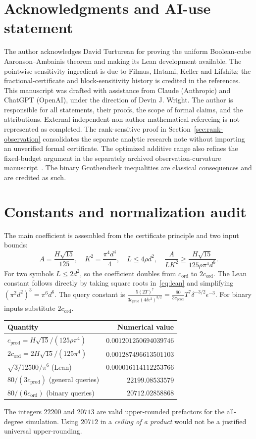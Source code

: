 \documentclass[11pt]{article}
\numberwithin{equation}{section}
\theoremstyle{remark}
\newcommand{\cprod}{c_{\mathrm{prod}}}
\newcommand{\cord}{c_{\mathrm{ord}}}
\begin{document}
\section*{Acknowledgments and AI-use statement}
The author acknowledges David Turturean for proving the uniform Boolean-cube Aaronson--Ambainis theorem and making its Lean development available. The pointwise sensitivity ingredient is due to Filmus, Hatami, Keller and Lifshitz; the fractional-certificate and block-sensitivity history is credited in the references. This manuscript was drafted with assistance from Claude (Anthropic) and ChatGPT (OpenAI), under the direction of Devin J. Wright. The author is responsible for all statements, their proofs, the scope of formal claims, and the attributions. External independent non-author mathematical refereeing is not represented as completed. The rank-sensitive proof in Section~\ref{sec:rank-observation} consolidates the separate analytic research note without importing an unverified formal certificate. The optimized additive range also refines the fixed-budget argument in the separately archived observation-curvature manuscript~\cite{ObservationInfo26}. The binary Grothendieck inequalities are classical consequences and are credited as such.

\appendix
\section{Constants and normalization audit}\label{app:constants}
The main coefficient is assembled from the certificate principle and two input bounds:
\[
 A=\frac{H\sqrt{15}}{125},\quad K^2=\frac{\pi^4d^4}{4},\quad
 L\le4\rho d^2,\quad \frac{A}{LK^2}\ge\frac{H\sqrt{15}}{125\rho\pi^4d^6}.
\]
For two symbols $L\le2d^2$, so the coefficient doubles from $\cord$ to $2\cord$. The Lean constant follows directly by taking square roots in~\eqref{eq:lean} and simplifying $(\pi^2d^2)^3=\pi^6d^6$.
The query constant is $\frac{5(2T)^7}{3\cprod(4\delta\epsilon^2)^{3/2}}=\frac{80}{3\cprod}T^7\delta^{-3/2}\epsilon^{-3}$. For binary inputs substitute $2\cord$.
\begin{center}
\begin{tabular}{@{}>{\raggedright\arraybackslash}p{.48\linewidth}r@{}}\toprule
Quantity & Numerical value\\\midrule
$\cprod=H\sqrt{15}/(125\rho\pi^4)$ & $0.001201250694039746$\\
$2\cord=2H\sqrt{15}/(125\pi^4)$ & $0.001287496613501103$\\
$\sqrt{3/12500}/\pi^6$ (Lean) & $0.000016114112253766$\\
$80/(3\cprod)$ (general queries) & $22199.08533579$\\
$80/(6\cord)$ (binary queries) & $20712.02858868$\\\bottomrule
\end{tabular}
\end{center}
The integers $22200$ and $20713$ are valid upper-rounded prefactors for the all-degree simulation. Using $20712$ in a \emph{ceiling of a product} would not be a justified universal upper-rounding.
\end{document}
